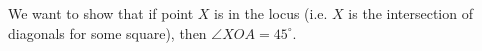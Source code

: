 













We want to show that if point $X$ is in the locus (i.e. $X$ is the intersection of diagonals for some square), then $\angle XOA = 45 ^\circ$.






